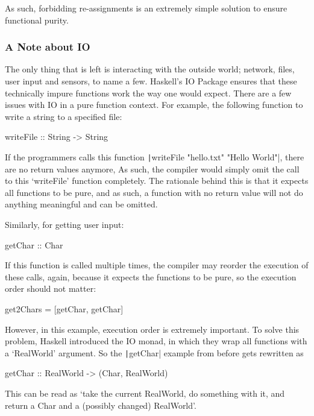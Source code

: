 As such, forbidding re-assignments is an extremely simple solution to
ensure functional purity.

\subsubsection{A Note about IO}
The only thing that is left is interacting with the outside world; network,
files, user input and sensors, to name a few. Haskell's IO Package ensures
that these technically impure functions work the way one would expect.
There are a few issues with IO in a pure function context. For example,
the following function to write a string to a specified file:

\begin{haskellcode}
    writeFile :: String -> String
\end{haskellcode}

If the programmers calls this function
\texttt|writeFile "hello.txt" "Hello World"|, there are
no return values anymore, As such, the compiler would simply omit the call
to this `writeFile' function completely. The rationale behind this is that
it expects all functions to be pure, and as such, a function with no return
value will not do anything meaningful and can be omitted.

Similarly, for getting user input:
\begin{haskellcode}
    getChar :: Char
\end{haskellcode}

If this function is called multiple times, the compiler may reorder the
execution of these calls, again, because it expects the functions to be
pure, so the execution order should not matter:
\begin{haskellcode}
    get2Chars = [getChar, getChar]
\end{haskellcode}

However, in this example, execution order is extremely important. To
solve this problem, Haskell introduced the IO monad, in which they
wrap all functions with a `RealWorld' argument. So the
\texttt|getChar| example from before gets rewritten as

\begin{haskellcode}
    getChar :: RealWorld -> (Char, RealWorld)
\end{haskellcode}

This can be read as `take the current RealWorld, do something with it,
and return a Char and a (possibly changed) RealWorld'\autocite{haskell-io}.

